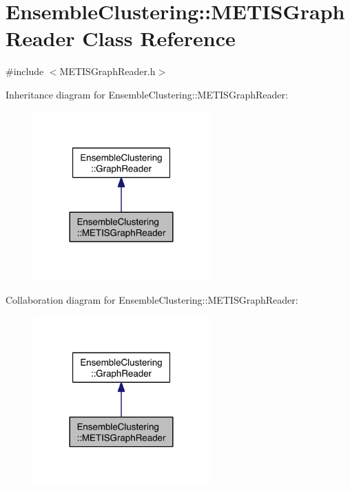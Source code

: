 \hypertarget{class_ensemble_clustering_1_1_m_e_t_i_s_graph_reader}{\section{Ensemble\-Clustering\-:\-:M\-E\-T\-I\-S\-Graph\-Reader Class Reference}
\label{class_ensemble_clustering_1_1_m_e_t_i_s_graph_reader}
}


{\ttfamily \#include $<$M\-E\-T\-I\-S\-Graph\-Reader.\-h$>$}



Inheritance diagram for Ensemble\-Clustering\-:\-:M\-E\-T\-I\-S\-Graph\-Reader\-:
\nopagebreak
\begin{figure}[H]
\begin{center}
\leavevmode
\includegraphics[width=192pt]{class_ensemble_clustering_1_1_m_e_t_i_s_graph_reader__inherit__graph}
\end{center}
\end{figure}


Collaboration diagram for Ensemble\-Clustering\-:\-:M\-E\-T\-I\-S\-Graph\-Reader\-:
\nopagebreak
\begin{figure}[H]
\begin{center}
\leavevmode
\includegraphics[width=192pt]{class_ensemble_clustering_1_1_m_e_t_i_s_graph_reader__coll__graph}
\end{center}
\end{figure}
